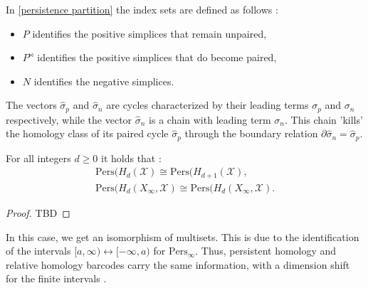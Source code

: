\begin{remark}
In \ref{persistence partition} the index sets are defined as follows \cite[p.8]{de2011dualities}:
\begin{itemize}
	\item $P$ identifies the positive simplices that remain unpaired,

	\item $P^{\Join}$ identifies the positive simplices that do become paired,

	\item $N$ identifies the negative simplices.
\end{itemize}
The vectors $\hat{\sigma}_{p}$ and $\hat{\sigma}_{n}$ are cycles characterized by
their leading terms $\sigma_{p}$ and $\sigma_{n}$ respectively, while the vector
$\hat{\sigma}_{n}$ is a chain with leading term $\sigma_{n}$. This chain 'kills'
the homology class of its paired cycle $\hat{\sigma}_{p}$ through the boundary relation
$\partial \hat{\sigma}_{n} = \hat{\sigma}_{p}$.
\end{remark}

\begin{theorem}
	For all integers $d \geq 0$ it holds that \cite[\S 2.4]{de2011dualities}:
	\begin{align*}
		\mathrm{Pers}(H_{d}(\mathcal{X}) \cong \mathrm{Pers}(H_{d+1}(\mathcal{X}),                       \\
		\mathrm{Pers}(H_{d}(X_{\infty}, \mathcal{X}) \cong \mathrm{Pers}(H_{d}(X_{\infty}, \mathcal{X}).
	\end{align*}
\end{theorem}

\begin{proof}
TBD
\end{proof}

\begin{remark}
	In this case, we get an isomorphism of multisets. This is due to the identification
	of the intervals $[a,\infty) \leftrightarrow [-\infty, a)$ for $\mathrm{Pers}_{\infty}$.
	Thus, persistent homology and relative homology barcodes carry the same information,
	with a dimension shift for the finite intervals \cite[\S 2.4]{de2011dualities}.
\end{remark}

